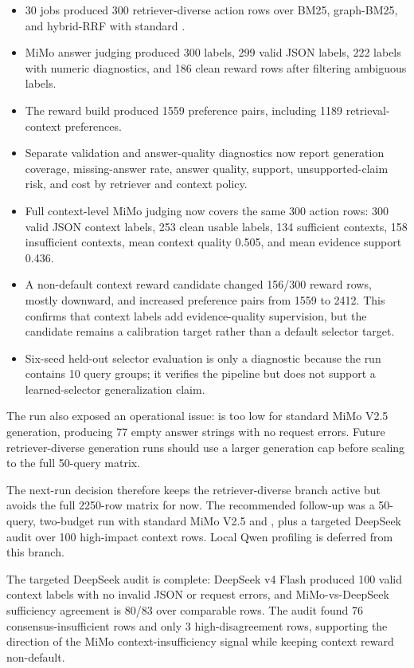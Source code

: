 \begin{itemize}[leftmargin=*]
  \item 30 jobs produced 300 retriever-diverse action rows over BM25, graph-BM25, and hybrid-RRF with standard .
  \item MiMo answer judging produced 300 labels, 299 valid JSON labels, 222 labels with numeric diagnostics, and 186 clean reward rows after filtering ambiguous labels.
  \item The reward build produced 1559 preference pairs, including 1189 retrieval-context preferences.
  \item Separate validation and answer-quality diagnostics now report generation coverage, missing-answer rate, answer quality, support, unsupported-claim risk, and cost by retriever and context policy.
  \item Full context-level MiMo judging now covers the same 300 action rows: 300 valid JSON context labels, 253 clean usable labels, 134 sufficient contexts, 158 insufficient contexts, mean context quality 0.505, and mean evidence support 0.436.
  \item A non-default context reward candidate changed 156/300 reward rows, mostly downward, and increased preference pairs from 1559 to 2412. This confirms that context labels add evidence-quality supervision, but the candidate remains a calibration target rather than a default selector target.
  \item Six-seed held-out selector evaluation is only a diagnostic because the run contains 10 query groups; it verifies the pipeline but does not support a learned-selector generalization claim.
\end{itemize}

The run also exposed an operational issue:  is too low for standard MiMo V2.5 generation, producing 77 empty answer strings with no request errors. Future retriever-diverse generation runs should use a larger generation cap before scaling to the full 50-query matrix.

The next-run decision therefore keeps the retriever-diverse branch active but avoids the full 2250-row matrix for now. The recommended follow-up was a 50-query, two-budget run with standard MiMo V2.5 and , plus a targeted DeepSeek audit over 100 high-impact context rows. Local Qwen profiling is deferred from this branch.

The targeted DeepSeek audit is complete: DeepSeek v4 Flash produced 100 valid context labels with no invalid JSON or request errors, and MiMo-vs-DeepSeek sufficiency agreement is 80/83 over comparable rows. The audit found 76 consensus-insufficient rows and only 3 high-disagreement rows, supporting the direction of the MiMo context-insufficiency signal while keeping context reward non-default.

